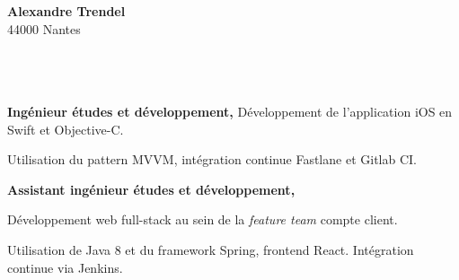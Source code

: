 \documentclass{cv}
\begin{document}
\pagestyle{empty}

\begin{minipage}[c]{0.6\textwidth}
\end{minipage}
\begin{minipage}[c]{0.4\textwidth}

\textbf{\large Alexandre Trendel} \\
44000 Nantes \\
\\
 \href{mailto:%
}{\link{%
}} \\
 \href{https://github.com/xou816}{} \\

\end{minipage}

\vspace{1cm}


\begin{mainexpbox}[title=nov. 2019 -- aujourd'hui]

	\begin{minipage}[c]{20mm}
	\end{minipage}
	\begin{minipage}[c]{0.8\textwidth}

	\textbf{Ingénieur études et développement, \evtech{}} \newline
	Développement de l'application iOS \href{https://apps.apple.com/fr/app/oui-sncf-train-et-bus/id343889987}{} en Swift et Objective-C. 

	Utilisation du pattern MVVM, intégration continue Fastlane et Gitlab CI.
	\end{minipage}

\end{mainexpbox}

\begin{expbox}[title={déc. 2016, \faicon{clock-o} 3 ans}]

	\begin{minipage}[c]{20mm}
	\end{minipage}
	\begin{minipage}[c]{0.8\textwidth}

	\textbf{Assistant ingénieur études et développement, \evtech{}}

	Développement web full-stack au sein de la \textit{feature team} compte client.

	Utilisation de Java 8 et du framework Spring, frontend React. Intégration continue via Jenkins.
	\end{minipage}

\end{expbox}
\end{document}
